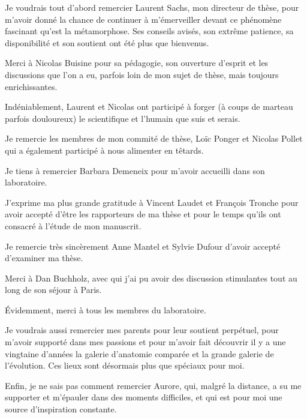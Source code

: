 \documentclass[../main.tex]{subfiles}
\begin{document}
Je voudrais tout d'abord remercier Laurent Sachs, mon directeur de thèse, pour m'avoir donné la chance de continuer à m’émerveiller devant ce phénomène fascinant qu'est la métamorphose. Ses conseils avisés, son extrême patience, sa disponibilité et son soutient ont été plus que bienvenus.
\par
Merci à Nicolas Buisine pour sa pédagogie, son ouverture d'esprit et les discussions que l'on a eu, parfois loin de mon sujet de thèse, mais toujours enrichissantes.
\par
Indéniablement, Laurent et Nicolas ont participé à forger (à coups de marteau parfois douloureux) le scientifique et l'humain que suis et serais.
\par
Je remercie les membres de mon commité de thèse, Loïc Ponger et Nicolas Pollet qui a également participé à nous alimenter en têtards.
\par
Je tiens à remercier Barbara Demeneix pour m'avoir accueilli dans son laboratoire.
\par
J'exprime ma plus grande gratitude à Vincent Laudet et François Tronche pour avoir accepté d'être les rapporteurs de ma thèse et pour le temps qu'ils ont consacré à l'étude de mon manuscrit.
\par
Je remercie très sincèrement Anne Mantel et Sylvie Dufour d'avoir accepté d’examiner ma thèse.
\par
Merci à Dan Buchholz, avec qui j'ai pu avoir des discussion stimulantes tout au long de son séjour à Paris.
\par
Évidemment, merci à tous les membres du laboratoire.
\par
Je voudrais aussi remercier mes parents pour leur soutient perpétuel, pour m'avoir supporté dans mes passions et pour m'avoir fait découvrir il y a une vingtaine d'années la galerie d'anatomie comparée et la grande galerie de l'évolution.
Ces lieux sont désormais plus que spéciaux pour moi.
\par
Enfin, je ne sais pas comment remercier Aurore, qui, malgré la distance, a su me supporter et m'épauler dans des moments difficiles, et qui est pour moi une source d'inspiration constante.

\clearpage
\end{document}
